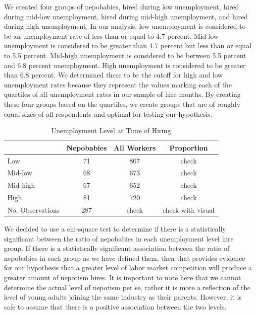 \documentclass[12pt]{article}
\begin{document}
We created four groups of nepobabies, hired during low unemployment, hired during mid-low unemployment, hired during mid-high unemployment, and hired during high unemployment. In our analysis, low unemployment is considered to be an unemployment rate of less than or equal to 4.7 percent. Mid-low unemployment is considered to be greater than 4.7 percent but less than or equal to 5.5 percent. Mid-high unemployment is considered to be between 5.5 percent and 6.8 percent unemployment. High unemployment is considered to be greater than 6.8 percent. We determined these to be the cutoff for high and low unemployment rates because they represent the values marking each of the quartiles of all unemployment rates in our sample of hire months. By creating these four groups based on the quartiles, we create groups that are of roughly equal sizes of all respondents and optimal for testing our hypothesis.

\begin{table}[ht]
\centering
\begin{tabular}{l|cc|c}
 & Nepobabies & All Workers & Proportion \\ 
\hline 
Low & 71 & 807 & check \\
Mid-low & 68 & 673 & check \\
Mid-high & 67 & 652 & check \\
High & 81 & 720 & check \\
\hline 
No. Observations & 287 & check & check with visual \\
\end{tabular}
\caption{Unemployment Level at Time of Hiring}
\label{tab:mytable}
\end{table}



We decided to use a chi-square test to determine if there is a statistically significant between the ratio of nepobabies in each unemployment level hire group. If there is a statistically significant association between the ratio of nepobabies in each group as we have defined them, then that provides evidence for our hypothesis that a greater level of labor market competition will produce a greater amount of nepotism hires. It is important to note here that we cannot determine the actual level of nepotism per se, rather it is more a reflection of the level of young adults joining the same industry as their parents. However, it is safe to assume that there is a positive association between the two levels.
\end{document}
